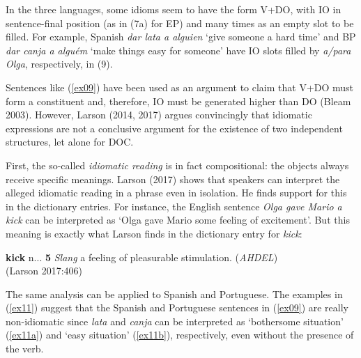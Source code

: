 \documentclass[output=paper,modfonts,nonflat]{langsci/langscibook}
\begin{document}
In the three languages, some idioms seem to have the form V+DO, with IO in sentence-final position (as in (7a) for EP) and many times as an empty slot to be filled. For example, Spanish \textit{dar lata a alguien} ‘give someone a hard time’ and BP \textit{dar canja a alguém} ‘make things easy for someone’ have IO slots filled by \textit{a/para Olga}, respectively, in (9).

\ea \label{ex09}
	\label{ex09a}
	\label{ex09b}
	\z
\z

Sentences like (\ref{ex09}) have been used as an argument to claim that V+DO must form a constituent and, therefore, IO must be generated higher than DO (Bleam 2003). However, Larson (2014, 2017) argues convincingly that idiomatic expressions are not a conclusive argument for the existence of two independent structures, let alone for DOC.

First, the so-called \textit{idiomatic reading} is in fact compositional: the objects always receive specific meanings. Larson (2017) shows that speakers can interpret the alleged idiomatic reading in a phrase even in isolation. He finds support for this in the dictionary entries. For instance, the English sentence \textit{Olga gave Mario a kick} can be interpreted as ‘Olga gave Mario some feeling of excitement’. But this meaning is exactly what Larson finds in the dictionary entry for \textit{kick}:

\ea \label{ex10}
	\textbf{kick} n... \textbf{5} \textit{Slang} a feeling of pleasurable stimulation. (\textit{AHDEL})\\
		(Larson 2017:406)
\z

The same analysis can be applied to Spanish and Portuguese. The examples in (\ref{ex11}) suggest that the Spanish and Portuguese sentences in (\ref{ex09}) are really non-idiomatic since \textit{lata} and \textit{canja} can be interpreted as ‘bothersome situation’ (\ref{ex11a}) and ‘easy situation’ (\ref{ex11b}), respectively, even without the presence of the verb.
\end{document}
